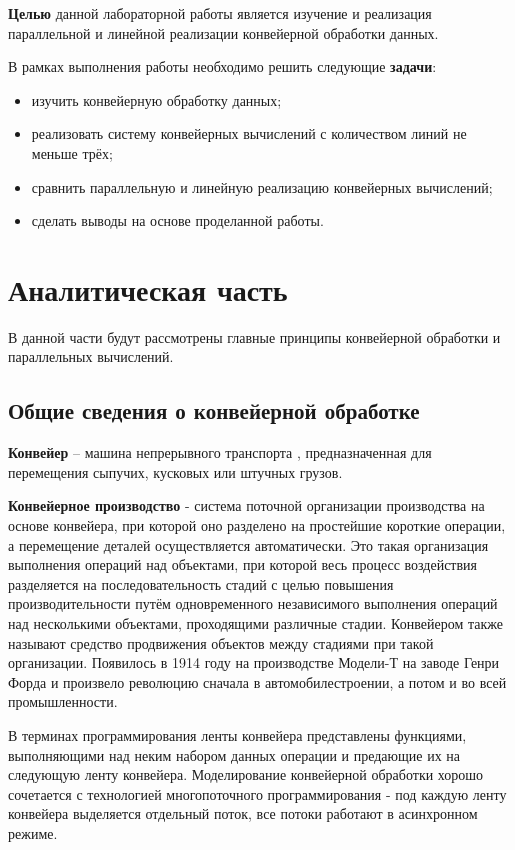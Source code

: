 \documentclass[12pt]{report}
\begin{document}
\textbf{Целью} данной лабораторной работы является изучение и реализация параллельной и линейной реализации конвейерной обработки данных.

В рамках выполнения работы необходимо решить следующие \textbf{задачи}:

\begin{itemize}
	\item изучить конвейерную обработку данных;
	\item реализовать систему конвейерных вычислений с количеством линий не меньше трёх;
	\item сравнить параллельную и линейную реализацию конвейерных вычислений;
	\item сделать выводы на основе проделанной работы.
\end{itemize}

\newpage
\chapter{Аналитическая часть}
В данной части будут рассмотрены главные принципы конвейерной обработки и параллельных вычислений.

\section{Общие сведения о конвейерной обработке}

\textbf{Конвейер} – машина непрерывного транспорта \cite{mednov}, предназначенная для перемещения сыпучих, кусковых или штучных грузов.

\textbf{Конвейерное производство} - система поточной организации производства на основе конвейера, при которой оно разделено на простейшие короткие операции, а перемещение деталей осуществляется автоматически. Это такая организация выполнения операций над объектами, при которой весь процесс воздействия разделяется на последовательность стадий с целью повышения производительности путём одновременного независимого выполнения операций над несколькими объектами, проходящими различные стадии. Конвейером также называют средство продвижения объектов между стадиями при такой организации\cite{wiki}. Появилось в 1914 году на производстве Модели-Т на заводе Генри Форда\cite{ford} и произвело революцию сначала в автомобилестроении, а потом и во всей промышленности.

В терминах программирования ленты конвейера представлены функциями, выполняющими над неким набором данных операции и предающие их на следующую ленту конвейера. Моделирование конвейерной обработки хорошо сочетается с технологией многопоточного программирования - под каждую ленту конвейера выделяется отдельный поток, все потоки работают в асинхронном режиме.
\end{document}
